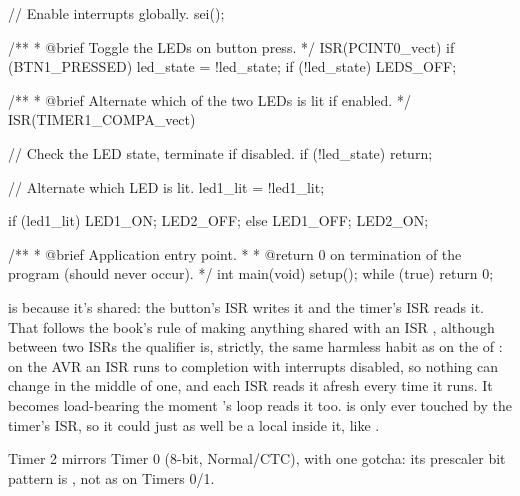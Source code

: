 \begin{ccode}
{    // Enable interrupts globally.
    sei();
}

/**
 * @brief Toggle the LEDs on button press.
 */
ISR(PCINT0_vect)
{
    if (BTN1_PRESSED)
    {
        led_state = !led_state;
        if (!led_state) { LEDS_OFF; }
    }
}

/**
 * @brief Alternate which of the two LEDs is lit if enabled.
 */
ISR(TIMER1_COMPA_vect)
{
    // Check the LED state, terminate if disabled.
    if (!led_state) { return; }

    // Alternate which LED is lit.
    led1_lit = !led1_lit;

    if (led1_lit)
    {
        LED1_ON;
        LED2_OFF;
    }
    else
    {
        LED1_OFF;
        LED2_ON;
    }
}

/**
 * @brief Application entry point.
 *
 * @return 0 on termination of the program (should never occur).
 */
int main(void)
{
    setup();
    while (true) {}
    return 0;
}
\end{ccode}

 is  because it's shared: the button's ISR writes it and the timer's
ISR reads it. That follows the book's rule of making anything shared with an ISR ,
although between two ISRs the qualifier is, strictly, the same harmless habit as on the
 of : on the AVR an ISR runs to completion with interrupts
disabled, so nothing can change  in the middle of one, and each ISR reads it afresh
every time it runs. It becomes load-bearing the moment 's loop reads it too.
 is only ever touched by the timer's ISR, so it could just as well be a
 local inside it, like .

Timer 2 mirrors Timer 0 (8-bit, Normal/CTC), with one gotcha: its  prescaler bit
pattern is , not  as on Timers 0/1.
